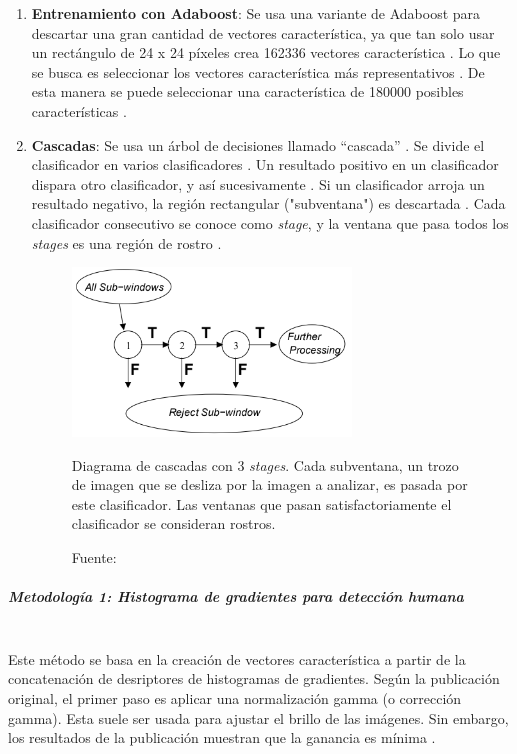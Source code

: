 \documentclass[a4paper,openright,12pt]{report}
\begin{document}
\begin{enumerate}
    \item \textbf{Entrenamiento con  Adaboost}: 
    Se usa una variante de Adaboost para descartar una gran cantidad de vectores
    característica, ya que tan solo usar un rectángulo de 24 x 24 píxeles crea
    162336 vectores característica \cite{wang2014analysis}.
    Lo que se busca es seleccionar los vectores característica más
    representativos \cite{violajones}. De esta manera se puede seleccionar una
    característica de 180000 posibles características \cite{violajones}.

    \item \textbf{Cascadas}:
    Se usa un árbol de decisiones llamado ``cascada'' \cite{violajones}.
    Se divide el clasificador en varios clasificadores \cite{violajones}.
    Un resultado positivo en un clasificador dispara otro clasificador, y así
    sucesivamente \cite{violajones}. Si un clasificador arroja un resultado
    negativo, la región rectangular ("subventana") es descartada
    \cite{violajones}. Cada clasificador consecutivo se conoce como
    \textit{stage}, y la ventana que pasa todos los \textit{stages} es una
    región de rostro \cite{violajones}.

    \begin{figure}[H]
      \centering
        \includegraphics[width=0.7\textwidth]{../images/cascade-diagram.png}\par
      \caption{Diagrama de cascadas con 3 \textit{stages}. Cada subventana, un
      trozo de imagen que se desliza por la imagen a analizar, es pasada por
      este clasificador. Las ventanas que pasan satisfactoriamente el
      clasificador se consideran rostros.}
      \caption*{Fuente: \cite{violajones}}
      \label{fig:cascades-diagram}
    \end{figure}
\end{enumerate}

\subparagraph{Metodología 1: Histograma de gradientes para detección humana}\mbox{} \\
Este método se basa en la creación de vectores característica a partir de la
concatenación de desriptores de histogramas de gradientes. Según la publicación
original, el primer paso es aplicar una normalización gamma (o corrección
gamma). Esta suele ser usada para ajustar el brillo de las imágenes. Sin
embargo, los resultados de la publicación muestran que la ganancia es mínima
\cite{dalal2005histograms}.\\
\end{document}
